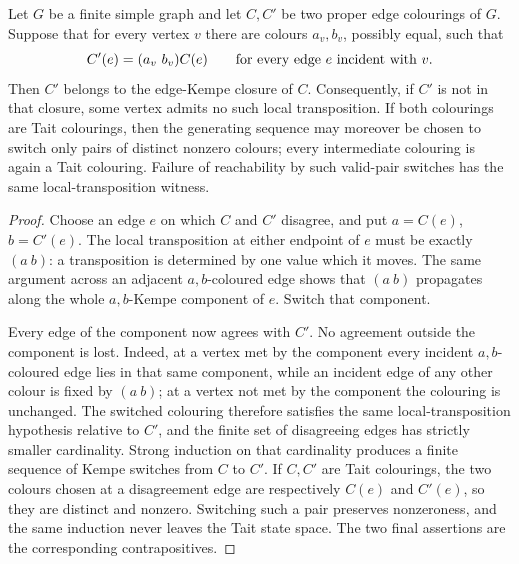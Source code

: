 \begin{lemma}
\label{lem:local-transpositions-generate-kempe}
Let \(G\) be a finite simple graph and let \(C,C'\) be two proper edge
colourings of \(G\).  Suppose that for every vertex \(v\) there are colours
\(a_v,b_v\), possibly equal, such that
\[
 C'(e)=(a_v\ b_v)C(e)
 \qquad\hbox{for every edge \(e\) incident with \(v\)}.
\]
Then \(C'\) belongs to the edge-Kempe closure of \(C\).  Consequently, if
\(C'\) is not in that closure, some vertex admits no such local
transposition.  If both colourings are Tait colourings, then the generating
sequence may moreover be chosen to switch only pairs of distinct nonzero
colours; every intermediate colouring is again a Tait colouring.  Failure of
reachability by such valid-pair switches has the same local-transposition
witness.
\end{lemma}

\begin{proof}
Choose an edge \(e\) on which \(C\) and \(C'\) disagree, and put
\(a=C(e)\), \(b=C'(e)\).  The local transposition at either endpoint of \(e\)
must be exactly \((a\ b)\): a transposition is determined by one value which
it moves.  The same argument across an adjacent \(a,b\)-coloured edge shows
that \((a\ b)\) propagates along the whole \(a,b\)-Kempe component of \(e\).
Switch that component.

Every edge of the component now agrees with \(C'\).  No agreement outside
the component is lost.  Indeed, at a vertex met by the component every
incident \(a,b\)-coloured edge lies in that same component, while an incident
edge of any other colour is fixed by \((a\ b)\); at a vertex not met by the
component the colouring is unchanged.  The switched colouring therefore
satisfies the same local-transposition hypothesis relative to \(C'\), and
the finite set of disagreeing edges has strictly smaller cardinality.  Strong
induction on that cardinality produces a finite sequence of Kempe switches
from \(C\) to \(C'\).  If \(C,C'\) are Tait colourings, the two colours
chosen at a disagreement edge are respectively \(C(e)\) and \(C'(e)\), so
they are distinct and nonzero.  Switching such a pair preserves nonzeroness,
and the same induction never leaves the Tait state space.  The two final
assertions are the corresponding contrapositives.
\end{proof}

